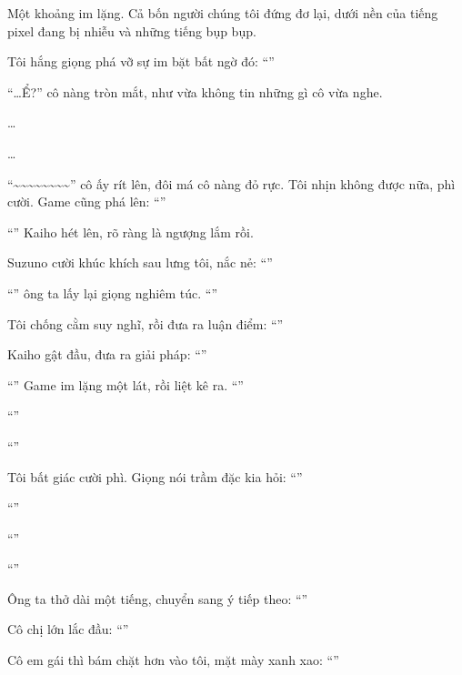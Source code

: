 \documentclass[../main.tex]{subfiles}
\begin{document}
Một khoảng im lặng. Cả bốn người chúng tôi đứng đơ lại, dưới nền của tiếng pixel đang bị nhiễu và những tiếng bụp bụp.

Tôi hắng giọng phá vỡ sự im bặt bất ngờ đó: ``''

``\dots Ể?'' cô nàng tròn mắt, như vừa không tin những gì cô vừa nghe.

\dots

\dots

``\~{}\~{}\~{}\~{}\~{}\~{}\~{}\~{}'' cô ấy rít lên, đôi má cô nàng đỏ rực. Tôi nhịn không được nữa, phì cười. Game cũng phá lên: ``''

``'' Kaiho hét lên, rõ ràng là ngượng lắm rồi.

Suzuno cười khúc khích sau lưng tôi, nắc nẻ: ``''

\ct

``'' ông ta lấy lại giọng nghiêm túc. ``''

Tôi chống cằm suy nghĩ, rồi đưa ra luận điểm: ``''

Kaiho gật đầu, đưa ra giải pháp: ``''

``'' Game im lặng một lát, rồi liệt kê ra. ``''

``''

``''

Tôi bất giác cười phì. Giọng nói trầm đặc kia hỏi: ``''

``''

``''

``''

Ông ta thở dài một tiếng, chuyển sang ý tiếp theo: ``''

Cô chị lớn lắc đầu: ``''

Cô em gái thì bám chặt hơn vào tôi, mặt mày xanh xao: ``''
\end{document}
